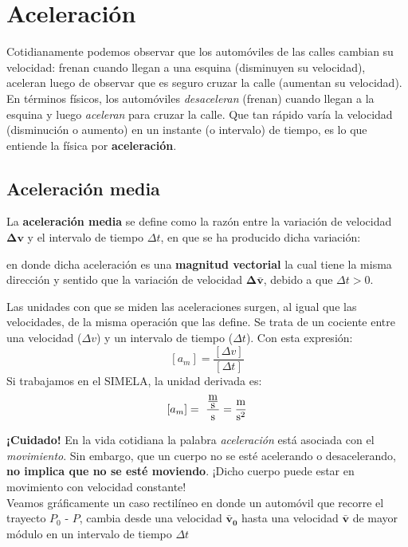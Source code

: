 \section{Aceleración}
Cotidianamente podemos observar que los automóviles de las calles cambian su velocidad: frenan cuando llegan a una esquina (disminuyen su velocidad), aceleran luego de observar que es seguro cruzar la calle (aumentan su velocidad). En términos físicos, los automóviles {\it desaceleran} (frenan) cuando llegan a la esquina y luego {\it aceleran} para cruzar la calle. Que tan rápido varía la velocidad (disminución o aumento) en un instante (o intervalo) de tiempo, es lo que entiende la física por {\bf aceleración}.

\subsection{Aceleración media}

La {\bf aceleración media }se define como la razón entre la variación de velocidad $\mathbold{\Delta v}$ y el intervalo de tiempo $\Delta t$, en que se ha producido dicha variación:

\begin{center}
\end{center}

en donde dicha aceleración es una {\bf magnitud vectorial} la cual tiene la misma dirección y sentido que la variación de velocidad $\mathbold{\Delta \bar{v}}$, debido a que $\Delta t > 0$. 


Las unidades con que se miden las aceleraciones surgen, al igual que las velocidades, de la misma operación que las define. Se trata de un cociente entre una velocidad ($\Delta v$) y un intervalo de tiempo ($\Delta t$). Con esta expresión: $$[a_m] = \frac{[\Delta v]}{[\Delta t]}$$
Si trabajamos en el SIMELA, la unidad derivada es: $$[a_m] =\ \frac{\mbox{$\!\!\ \frac{\mbox{m}}{\mbox{s}}$}}{\mbox{s}} =\frac{\textrm{m}}{\textrm{s}^2}$$


{\bf \color{BrickRed} {¡Cuidado!}} En la vida cotidiana la palabra {\it aceleración} está asociada con el {\it movimiento}. Sin embargo, que un cuerpo no se esté acelerando o desacelerando, {\bf no implica que no se esté moviendo}. ¡Dicho cuerpo puede estar en movimiento con velocidad constante!
\\


Veamos gráficamente un caso rectilíneo en donde un automóvil que recorre el trayecto $P_0$ - $P$, cambia desde una velocidad $\mathbold{\bar{v}_0}$ hasta una velocidad $\mathbold{\bar{v}}$ de mayor módulo en un intervalo de tiempo $\Delta t$

